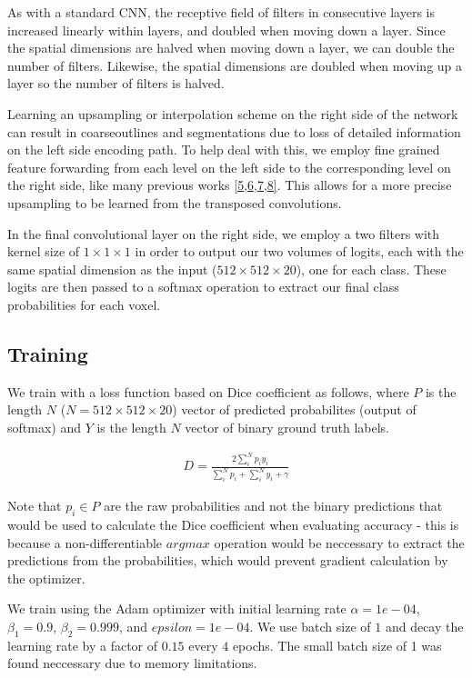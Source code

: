 \documentclass[11pt]{article}
\begin{document}
As with a standard CNN, the receptive field of filters in consecutive layers is increased linearly within layers, and doubled when moving down a layer. Since the spatial dimensions are halved when moving down a layer, we can double the number of filters. Likewise, the spatial dimensions are doubled when moving up a layer so the number of filters is halved.   

Learning an upsampling or interpolation scheme on the right side of the network can result in coarseoutlines and segmentations due to loss of detailed information on the left side encoding path. To help deal with this, we employ fine grained feature forwarding from each level on the left side to the corresponding level on the right side, like many previous works \hyperref[noh]{[5,6,7,8]}. This allows for a more precise upsampling to be learned from the transposed convolutions. 

In the final convolutional layer on the right side, we employ a two filters with kernel size of $1 \times 1 \times 1$ in order to output our two volumes of logits, each with the same spatial dimension as the input ($512 \times 512 \times 20$), one for each class. These logits are then passed to a softmax operation to extract our final class probabilities for each voxel. 

\subsection{Training}

We train with a loss function based on Dice coefficient as follows, where $P$ is the length $N$ ($N = 512 \times 512 \times 20$) vector of predicted probabilites (output of softmax) and $Y$ is the length $N$ vector of binary ground truth labels.

\begin{align*}
D = \frac{2\sum_{i}^{N}p_iy_i}{\sum_{i}^{N}p_i + \sum_{i}^{N}y_i + \gamma}
\end{align*}

Note that $p_i \in P$ are the raw probabilities and not the binary predictions that would be used to calculate the Dice coefficient when evaluating accuracy - this is because a non-differentiable $argmax$ operation would be neccessary to extract the predictions from the probabilities, which would prevent gradient calculation by the optimizer. 

We train using the Adam optimizer with initial learning rate $\alpha = 1e-04$, $\beta_1 = 0.9$, $\beta_2 = 0.999$, and $epsilon =1e-04$. We use batch size of $1$ and decay the learning rate by a factor of $0.15$ every $4$ epochs. The small batch size of 1 was found neccessary due to memory limitations.
\end{document}
